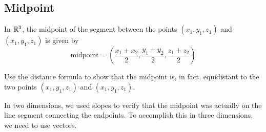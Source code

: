 \documentclass[handout]{ximera}
\begin{document}
\subsection{Midpoint}
In $\mathbb R^3$, the midpoint of the segment between the points $(x_1, y_1, z_1)$ and $(x_1, y_1, z_1)$ is given by 
\[
\text{midpoint} = \left(\frac{x_1 + x_2}{2}, \frac{y_1 + y_2}{2}, \frac{z_1 + z_2}{2}\right)
\]

\begin{problem} 
Use the distance formula to show that the midpoint is, in fact, equidistant to the two points $(x_1, y_1, z_1)$ and $(x_1, y_1, z_1)$.
\end{problem}

In two dimensions, we used slopes to verify that the midpoint was actually on the line segment connecting the endpoints.  
To accomplish this in three dimensions, we need to use vectors.
\end{document}
